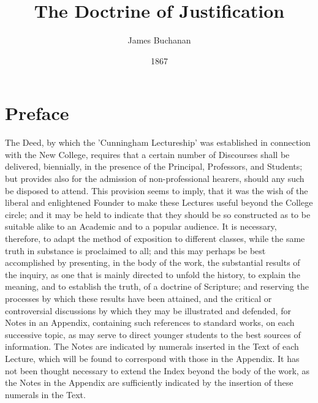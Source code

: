 \documentclass[
]{book}
\title{The Doctrine of Justification}
\author{James Buchanan}
\date{1867}
\begin{document}
\maketitle

\mainmatter

{
\setcounter{tocdepth}{1}
\tableofcontents
}
\hypertarget{preface}{%
\chapter*{Preface}\label{preface}}

The Deed, by which the 'Cunningham Lectureship' was established in connection with the New College, requires that a certain number of Discourses shall be delivered, biennially, in the presence of the Principal, Professors, and Students; but provides also for the admission of non-professional hearers, should any such be disposed to attend. This provision seems to imply, that it was the wish of the liberal and enlightened Founder to make these Lectures useful beyond the College circle; and it may be held to indicate that they should be so constructed as to be suitable alike to an Academic and to a popular audience. It is necessary, therefore, to adapt the method of exposition to different classes, while the same truth in substance is proclaimed to all; and this may perhaps be best accomplished by presenting, in the body of the work, the substantial results of the inquiry, as one that is mainly directed to unfold the history, to explain the meaning, and to establish the truth, of a doctrine of Scripture; and reserving the processes by which these results have been attained, and the critical or controversial discussions by which they may be illustrated and defended, for Notes in an Appendix, containing such references to standard works, on each successive topic, as may serve to direct younger students to the best sources of information. The Notes are indicated by numerals inserted in the Text of each Lecture, which will be found to correspond with those in the Appendix. It has not been thought necessary to extend the Index beyond the body of the work, as the Notes in the Appendix are sufficiently indicated by the insertion of these numerals in the Text.
\end{document}
